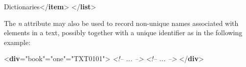 \begin{shaded}
Dictionaries{</\textbf{item}>}\mbox{}\newline 
{</\textbf{list}>}\end{shaded}\egroup\par \noindent  The {\itshape n} attribute may also be used to record non-unique names associated with elements in a text, possibly together with a unique identifier as in the following example: \par\bgroup{}\exampleFont \begin{shaded}\noindent\mbox{}{<\textbf{div}\hspace*{1em}{type}="{book}"\hspace*{1em}{n}="{one}"\hspace*{1em}{xml:id}="{TXT0101}">}\mbox{}\newline 
\textit{<!-- ... -->}\mbox{}\newline 
{}\mbox{}\newline 
\textit{<!-- ... -->}\mbox{}\newline 
{}\mbox{}\newline 
{</\textbf{div}>}\end{shaded}\egroup\par \par
